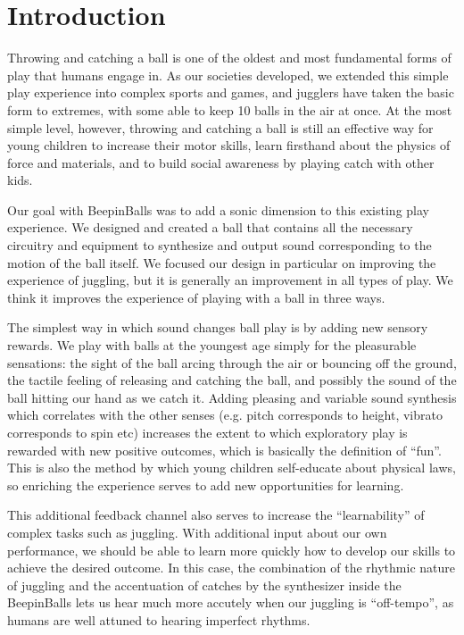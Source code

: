\documentclass{nime-alternate}
\begin{document}

\section{Introduction}

Throwing and catching a ball is one of the oldest and most fundamental forms
of play that humans engage in. As our societies developed, we extended 
this simple play experience into complex sports and games, and jugglers 
have taken the basic form to extremes, with 
some able to keep 10 balls in the air at once. At the most simple level,
however, throwing and catching a ball is still an effective way for young 
children to increase their motor skills, learn firsthand about the physics of
force and materials, and to build social awareness by playing catch with other
kids.

Our goal with BeepinBalls was to add a sonic dimension to this existing play
experience. We designed and created a ball that contains all the necessary
circuitry and equipment to synthesize and output sound corresponding to
the motion of the ball itself. We focused our design in particular on 
improving the experience of juggling, but it is generally an improvement
in all types of play. We think it improves the experience of playing with a ball
in three ways.

The simplest way in which sound changes ball play is by adding new sensory rewards.
We play with balls at the youngest age simply for the pleasurable sensations:
the sight of the ball arcing through the air or bouncing off the ground, the
tactile feeling of releasing and catching the ball, and possibly the sound of the
ball hitting our hand as we catch it. Adding pleasing and variable sound
synthesis which correlates with the other senses (e.g. pitch corresponds to height,
vibrato corresponds to spin etc) increases the extent to which exploratory
play is rewarded with new positive outcomes, which is basically the
definition of ``fun''. This is also the method by which young children self-educate
about physical laws, so enriching the experience serves to add new opportunities
for learning.

This additional feedback channel also serves to increase the ``learnability''
of complex tasks such as juggling. With additional input about our own
performance, we should be able to learn more quickly how to develop our
skills to achieve the desired outcome. In this case, the combination of the
rhythmic nature of juggling and the accentuation of catches by the synthesizer
inside the BeepinBalls lets us hear much more accutely when our juggling is
``off-tempo'', as humans are well attuned to hearing imperfect rhythms.
\end{document}
